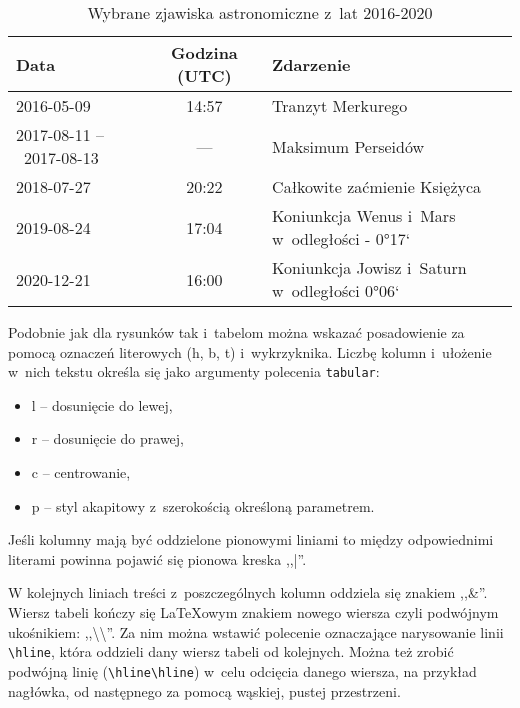 \begin{table}[h]
    \centering
    \begin{tabular}{p{2.5cm}c|l}
        Data                     & Godzina (UTC) & Zdarzenie                                     \\\hline\hline
        2016-05-09               & 14:57         & Tranzyt Merkurego                             \\\hline
        2017-08-11 --~2017-08-13 & ---           & Maksimum Perseidów                            \\\hline
        2018-07-27               & 20:22         & Całkowite zaćmienie Księżyca                  \\\hline
        2019-08-24               & 17:04         & Koniunkcja Wenus i~Mars w~odległości - 0°17`  \\\hline
        2020-12-21               & 16:00         & Koniunkcja Jowisz i~Saturn w~odległości 0°06`
    \end{tabular}
    \caption{\label{tab:zjawiska}Wybrane zjawiska astronomiczne z~lat 2016-2020}
\end{table}

Podobnie jak dla rysunków tak i~tabelom można wskazać posadowienie za pomocą oznaczeń literowych (h, b, t) i~wykrzyknika. Liczbę kolumn i~ułożenie w~nich tekstu określa się jako argumenty polecenia \texttt{tabular}:
\begin{itemize}
    \item l -- dosunięcie do lewej,
    \item r -- dosunięcie do prawej,
    \item c -- centrowanie,
    \item p -- styl akapitowy z~szerokością określoną parametrem.
\end{itemize}
Jeśli kolumny mają być oddzielone pionowymi liniami to między odpowiednimi literami powinna pojawić się pionowa kreska ,,|''.

W kolejnych liniach treści z~poszczególnych kolumn oddziela się znakiem ,,\&''. Wiersz tabeli kończy się {\LaTeX}owym znakiem nowego wiersza czyli podwójnym ukośnikiem: ,,\textbackslash\textbackslash''. Za nim można wstawić polecenie oznaczające narysowanie linii \texttt{\textbackslash{}hline}, która oddzieli dany wiersz tabeli od kolejnych. Można też zrobić podwójną linię (\texttt{\textbackslash{}hline\textbackslash{}hline}) w~celu odcięcia danego wiersza, na przykład nagłówka, od następnego za pomocą wąskiej, pustej przestrzeni.

